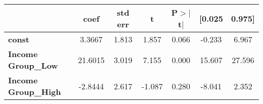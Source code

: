 \begin{center}
\begin{tabular}{lcccccc}
\toprule
                            & \textbf{coef} & \textbf{std err} & \textbf{t} & \textbf{P$> |$t$|$} & \textbf{[0.025} & \textbf{0.975]}  \\
\midrule
\textbf{const}              &       3.3667  &        1.813     &     1.857  &         0.066        &       -0.233    &        6.967     \\
\textbf{Income Group\_Low}  &      21.6015  &        3.019     &     7.155  &         0.000        &       15.607    &       27.596     \\
\textbf{Income Group\_High} &      -2.8444  &        2.617     &    -1.087  &         0.280        &       -8.041    &        2.352     \\
\bottomrule
\end{tabular}
\end{center}
